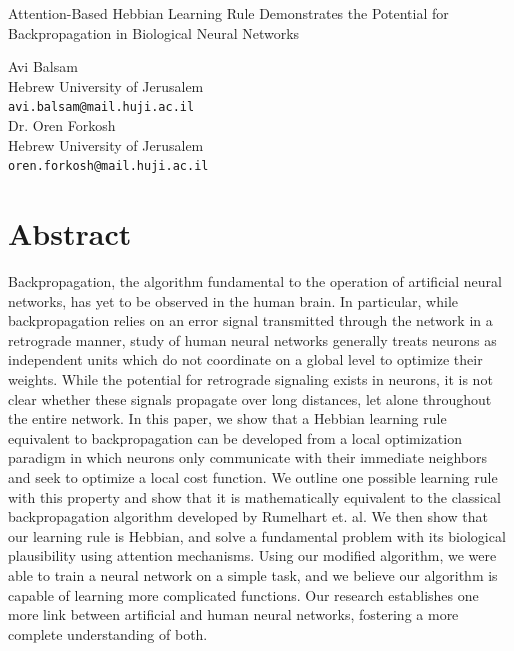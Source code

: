 \documentclass[12pt]{article}
\begin{document}
\begin{center}
\Large
Attention-Based Hebbian Learning Rule Demonstrates the Potential for Backpropagation in Biological Neural Networks
\end{center}

\begin{center}
Avi Balsam \\
Hebrew University of Jerusalem\\
\verb+avi.balsam@mail.huji.ac.il+\\
\vspace{0.2cm}
Dr. Oren Forkosh\\
Hebrew University of Jerusalem\\
\verb+oren.forkosh@mail.huji.ac.il+
\end{center}

\section{Abstract}
Backpropagation, the algorithm fundamental to the operation of artificial neural networks, has yet to be observed in the human brain. In particular, while backpropagation relies on an error signal transmitted through the network in a retrograde manner, study of human neural networks generally treats neurons as independent units which do not coordinate on a global level to optimize their weights. While the potential for retrograde signaling exists in neurons, it is not clear whether these signals propagate over long distances, let alone throughout the entire network. In this paper, we show that a Hebbian learning rule equivalent to backpropagation can be developed from a local optimization paradigm in which neurons only communicate with their immediate neighbors and seek to optimize a local cost function. We outline one possible learning rule with this property and show that it is mathematically equivalent to the classical backpropagation algorithm developed by Rumelhart et. al. We then show that our learning rule is Hebbian, and solve a fundamental problem with its biological plausibility using attention mechanisms. Using our modified algorithm, we were able to train a neural network on a simple task, and we believe our algorithm is capable of learning more complicated functions. Our research establishes one more link between artificial and human neural networks, fostering a more complete understanding of both.
\end{document}
